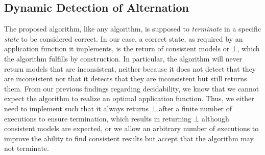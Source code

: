 



\subsection{Dynamic Detection of Alternation} %
\label{chap:orchestration:conservative:alternation}

The proposed algorithm, like any algorithm, is supposed to \emph{terminate} in a specific \emph{state} to be considered correct.
In our case, a correct state, as required by an application function it implements, is the return of consistent models or $\bot$, which the algorithm fulfills by construction.
In particular, the algorithm will never return models that are inconsistent, neither because it does not detect that they are inconsistent nor that it detects that they are inconsistent but still returns them.
From our previous findings regarding decidability, we know that we cannot expect the algorithm to realize an optimal application function.
Thus, we either need to implement  such that it always returns $\bot$ after a finite number of executions to ensure termination, which results in returning $\bot$ although consistent models are expected, or we allow an arbitrary number of executions to improve the ability to find consistent results but accept that the algorithm may not terminate.

